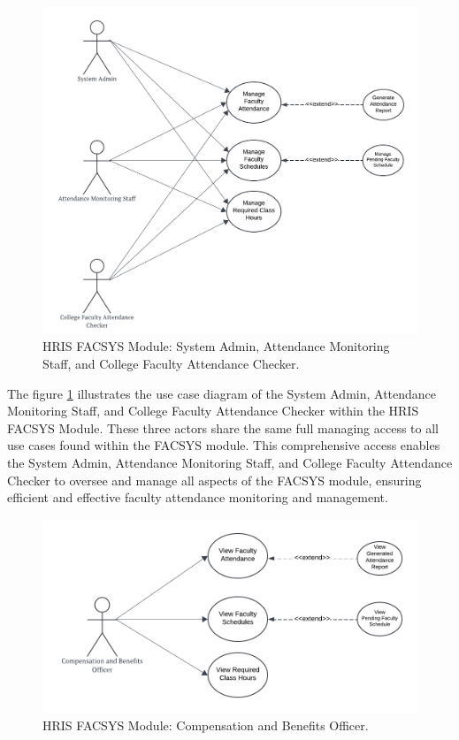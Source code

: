     \begin{figure}[H]
        \centering
        \includegraphics[width=0.9\linewidth]{figures/images/use-case-fac-1.png}
        \caption{HRIS FACSYS Module: System Admin, Attendance Monitoring Staff, and College Faculty Attendance Checker.}
        \label{fig:use-case-fac-1}
    \end{figure}

    The figure \ref{fig:use-case-fac-1} illustrates the use case diagram of the System Admin, Attendance Monitoring Staff, and College Faculty Attendance Checker within the HRIS FACSYS Module. These three actors share the same full managing access to all use cases found within the FACSYS module. This comprehensive access enables the System Admin, Attendance Monitoring Staff, and College Faculty Attendance Checker to oversee and manage all aspects of the FACSYS module, ensuring efficient and effective faculty attendance monitoring and management.

    \begin{figure}[H]
        \centering
        \includegraphics[width=0.9\linewidth]{figures/images/use-case-fac-2.png}
        \caption{HRIS FACSYS Module: Compensation and Benefits Officer.}
        \label{fig:use-case-fac-2}
    \end{figure}

